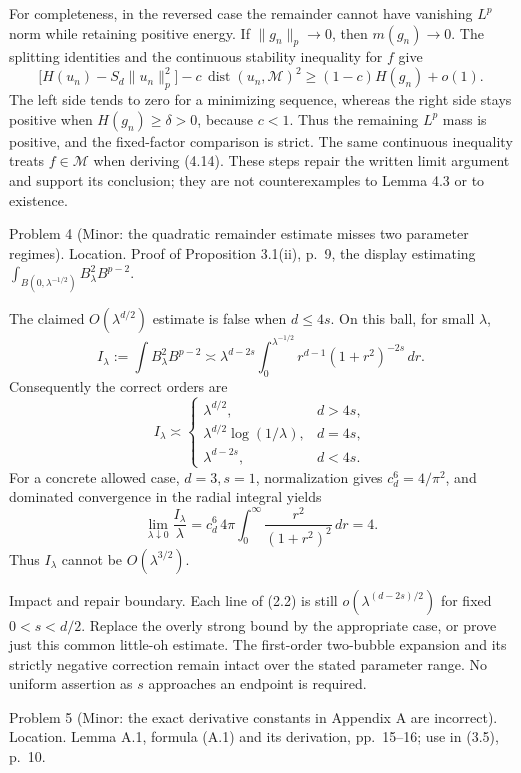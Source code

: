 \documentclass[10pt]{article}
\begin{document}
For completeness, in the reversed case the remainder cannot have vanishing \(L^p\) norm while retaining positive energy. If \(\|g_n\|_p\to0\), then \(m(g_n)\to0\). The splitting identities and the continuous stability inequality for \(f\) give \[\bigl[H(u_n)-S_d\|u_n\|_p^2\bigr]
 -c\,\operatorname{dist}(u_n,\mathcal M)^2
 \ge (1-c)H(g_n)+o(1).\] The left side tends to zero for a minimizing sequence, whereas the right side stays positive when \(H(g_n)\ge\delta>0\), because \(c<1\). Thus the remaining \(L^p\) mass is positive, and the fixed-factor comparison is strict. The same continuous inequality treats \(f\in\mathcal M\) when deriving (4.14). These steps repair the written limit argument and support its conclusion; they are not counterexamples to Lemma 4.3 or to existence.\par
Problem 4 (Minor: the quadratic remainder estimate misses two parameter regimes).  Location. Proof of Proposition 3.1(ii), p. 9, the display estimating \(\int_{B(0,\lambda^{-1/2})}B_\lambda^2B^{p-2}\).\par
The claimed \(O(\lambda^{d/2})\) estimate is false when \(d\le4s\). On this ball, for small \(\lambda\), \[I_\lambda:=\int B_\lambda^2B^{p-2}
 \asymp \lambda^{d-2s}
       \int_0^{\lambda^{-1/2}}r^{d-1}(1+r^2)^{-2s}\,dr.\] Consequently the correct orders are \[I_\lambda\asymp
 \begin{cases}
 \lambda^{d/2},&d>4s,\\
 \lambda^{d/2}\log(1/\lambda),&d=4s,\\
 \lambda^{d-2s},&d<4s.
 \end{cases}                                                       \tag{2.2}\] For a concrete allowed case, \(d=3,s=1\), normalization gives \(c_d^6=4/\pi^2\), and dominated convergence in the radial integral yields \[\lim_{\lambda\downarrow0}\frac{I_\lambda}{\lambda}
 =c_d^6\,4\pi\int_0^\infty\frac{r^2}{(1+r^2)^2}\,dr=4.\] Thus \(I_\lambda\) cannot be \(O(\lambda^{3/2})\).\par
Impact and repair boundary. Each line of (2.2) is still \(o(\lambda^{(d-2s)/2})\) for fixed \(0<s<d/2\). Replace the overly strong bound by the appropriate case, or prove just this common little-oh estimate. The first-order two-bubble expansion and its strictly negative correction remain intact over the stated parameter range. No uniform assertion as \(s\) approaches an endpoint is required.\par
Problem 5 (Minor: the exact derivative constants in Appendix A are incorrect).  Location. Lemma A.1, formula (A.1) and its derivation, pp. 15–16; use in (3.5), p. 10.\par
\end{document}

